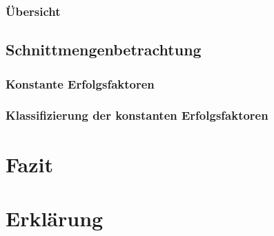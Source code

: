 \documentclass[12pt,a4paper,oneside]{article}
\newcommand{\EF}{Erfolgsfaktoren }
\begin{document}



























\subsubsection{Übersicht}

\subsection{Schnittmengenbetrachtung}
\subsubsection{Konstante \EF}
\subsubsection{Klassifizierung der konstanten \EF}

\section{Fazit}

\clearpage
{}
{}
\printbibliography[title=Literaturverzeichnis]

\clearpage
{}
{}
\section*{Erklärung}

\end{document}
